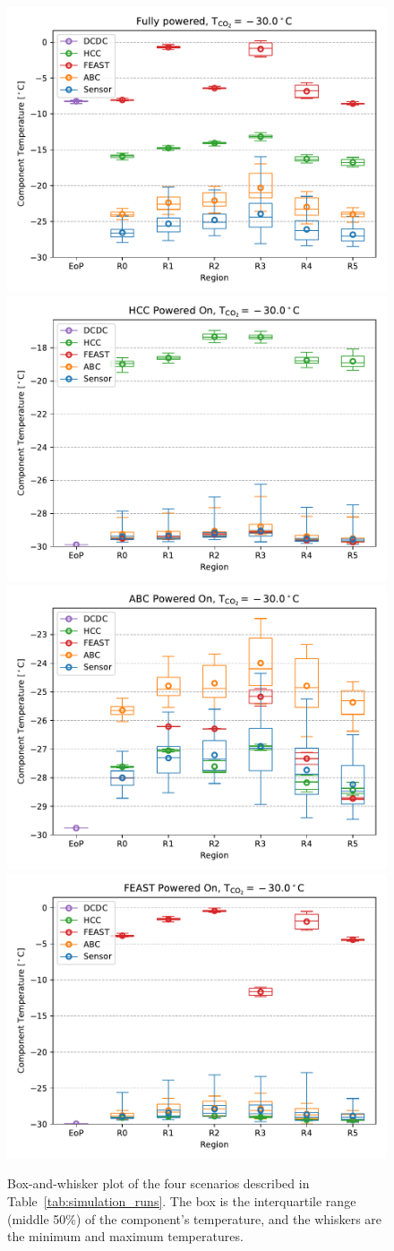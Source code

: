 \begin{figure}[ht!]
\includegraphics[width=0.49\linewidth]{figures/FEA_20171207_m30p0C_0p0Wm2C_DP1_ALL_S0.pdf}
\includegraphics[width=0.49\linewidth]{figures/FEA_20171207_m30p0C_0p0Wm2C_DP1_ALL_S1.pdf}\\
\includegraphics[width=0.49\linewidth]{figures/FEA_20171207_m30p0C_0p0Wm2C_DP1_ALL_S2.pdf}
\includegraphics[width=0.49\linewidth]{figures/FEA_20171207_m30p0C_0p0Wm2C_DP1_ALL_S3.pdf}
\caption{Box-and-whisker plot of the four scenarios described in Table~\ref{tab:simulation_runs}.
The box is the interquartile range (middle 50\%) of the component's temperature, and the whiskers are
the minimum and maximum temperatures.}
\label{thermal_data}
\end{figure}

